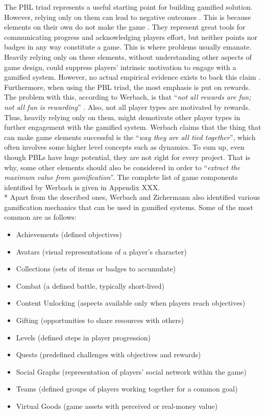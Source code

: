The PBL triad represents a useful starting point for building gamified solution. However, relying only on them can lead to negative outcomes \cite{werbach2012win}. This is because elements on their own do not make the game \cite{werbach2012win, WerbachCoursera}. They represent great tools for communicating progress and acknowledging players effort, but neither points nor badges in any way constitute a game. This is where problems usually emanate. Heavily relying only on these elements, without understanding other aspects of game design, could suppress players' intrinsic motivation to engage with a gamified system. However, no actual empirical evidence exists to back this claim \cite{mekler2013points}. Furthermore, when using the PBL triad, the most emphasis is put on rewards. The problem with this, according to Werbach, is that ``\textit{not all rewards are fun; not all fun is rewarding}'' \cite{WerbachCoursera}. Also, not all player types are motivated by rewards. Thus, heavily relying only on them, might demotivate other player types in further engagement with the gamified system. Werbach claims that the thing that can make game elements successful is the ``\textit{way they are all tied together}'', which often involves some higher level concepts such as dynamics. To sum up, even though PBLs have huge potential, they are not right for every project. That is why, some other elements should also be considered in order to ``\textit{extract the maximum value from gamification}''\cite{werbach2012win}. The complete list of game components identified by Werbach is given in Appendix XXX. \\*
Apart from the described ones, Werbach and Zichermann also identified various gamification mechanics that can be used in gamified systems. Some of the most common are as follows:\cite{zichermann2011gamification} 
\begin{itemize}
\item Achievements (defined objectives)
\item Avatars (visual representations of a player's character)
\item Collections (sets of items or badges to accumulate)
\item Combat (a defined battle, typically short-lived)
\item Content Unlocking (aspects available only when players reach objectives)
\item Gifting (opportunities to share resources with others)
\item Levels (defined steps in player progression)
\item Quests (predefined challenges with objectives and rewards)
\item Social Graphs (representation of players' social network within the game)
\item Teams (defined groups of players working together for a common goal)
\item Virtual Goods (game assets with perceived or real-money value)
\end{itemize}
